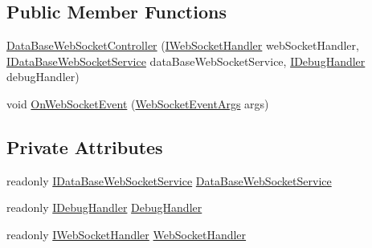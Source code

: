 \subsection*{Public Member Functions}
\begin{DoxyCompactItemize}
\item 
\mbox{\hyperlink{class_little_weeb_library_1_1_controllers_1_1_sub_controllers_1_1_data_base_web_socket_controller_ac8f85473ad0ccabfa985d704343a49a7}{Data\+Base\+Web\+Socket\+Controller}} (\mbox{\hyperlink{interface_little_weeb_library_1_1_handlers_1_1_i_web_socket_handler}{I\+Web\+Socket\+Handler}} web\+Socket\+Handler, \mbox{\hyperlink{interface_little_weeb_library_1_1_services_1_1_i_data_base_web_socket_service}{I\+Data\+Base\+Web\+Socket\+Service}} data\+Base\+Web\+Socket\+Service, \mbox{\hyperlink{interface_little_weeb_library_1_1_handlers_1_1_i_debug_handler}{I\+Debug\+Handler}} debug\+Handler)
\item 
void \mbox{\hyperlink{class_little_weeb_library_1_1_controllers_1_1_sub_controllers_1_1_data_base_web_socket_controller_a655abc0c42c54c9ff3572e4b4271fa3b}{On\+Web\+Socket\+Event}} (\mbox{\hyperlink{class_little_weeb_library_1_1_event_arguments_1_1_web_socket_event_args}{Web\+Socket\+Event\+Args}} args)
\end{DoxyCompactItemize}
\subsection*{Private Attributes}
\begin{DoxyCompactItemize}
\item 
readonly \mbox{\hyperlink{interface_little_weeb_library_1_1_services_1_1_i_data_base_web_socket_service}{I\+Data\+Base\+Web\+Socket\+Service}} \mbox{\hyperlink{class_little_weeb_library_1_1_controllers_1_1_sub_controllers_1_1_data_base_web_socket_controller_add7dc4cb6fa48d3349fc365ec0c4d9fb}{Data\+Base\+Web\+Socket\+Service}}
\item 
readonly \mbox{\hyperlink{interface_little_weeb_library_1_1_handlers_1_1_i_debug_handler}{I\+Debug\+Handler}} \mbox{\hyperlink{class_little_weeb_library_1_1_controllers_1_1_sub_controllers_1_1_data_base_web_socket_controller_a8653a13344308bd83e631d1028c5c845}{Debug\+Handler}}
\item 
readonly \mbox{\hyperlink{interface_little_weeb_library_1_1_handlers_1_1_i_web_socket_handler}{I\+Web\+Socket\+Handler}} \mbox{\hyperlink{class_little_weeb_library_1_1_controllers_1_1_sub_controllers_1_1_data_base_web_socket_controller_afbb86fe1001e699f3d5f777ea20bb731}{Web\+Socket\+Handler}}
\end{DoxyCompactItemize}


